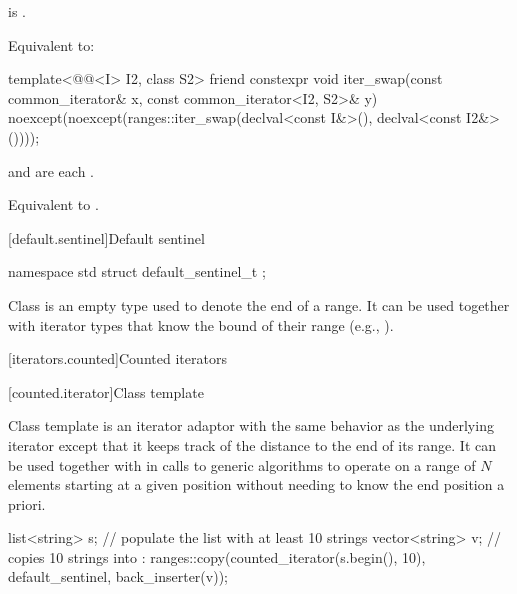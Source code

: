 \begin{itemdescr}
\pnum
\hardexpects
{} is .

\pnum
\effects
Equivalent to: 
\end{itemdescr}

%
\begin{itemdecl}
template<@@<I> I2, class S2>
  friend constexpr void iter_swap(const common_iterator& x, const common_iterator<I2, S2>& y)
    noexcept(noexcept(ranges::iter_swap(declval<const I&>(), declval<const I2&>())));
\end{itemdecl}

\begin{itemdescr}
\pnum
\hardexpects
{} and 
are each .

\pnum
\effects
Equivalent to .
\end{itemdescr}

[default.sentinel]{Default sentinel}

%
\begin{itemdecl}
namespace std {
  struct default_sentinel_t { };
}
\end{itemdecl}

\pnum
Class  is an empty type used to denote the end of a
range. It can be used together with iterator types that know the bound
of their range (e.g., ).

[iterators.counted]{Counted iterators}

[counted.iterator]{Class template }

\pnum
Class template  is an iterator adaptor
with the same behavior as the underlying iterator except that
it keeps track of the distance to the end of its range.
It can be used together with 
in calls to generic algorithms to operate on
a range of $N$ elements starting at a given position
without needing to know the end position a priori.

\pnum
\begin{example}
\begin{codeblock}
list<string> s;
// populate the list  with at least 10 strings
vector<string> v;
// copies 10 strings into :
ranges::copy(counted_iterator(s.begin(), 10), default_sentinel, back_inserter(v));
\end{codeblock}
\end{example}

